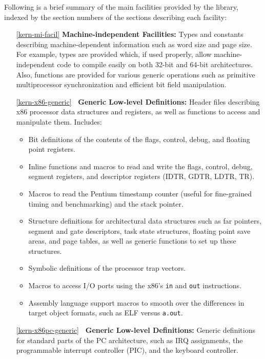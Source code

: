 Following is a brief summary of the main facilities provided by the library,
indexed by the section numbers of the sections describing each facility:
\begin{itemize}
\item[\ref{kern-mi-facil}]
	{\bf Machine-independent Facilities:}
	Types and constants describing machine-dependent information
	such as word size and page size.
	For example, types are provided which, if used properly,
	allow machine-independent code
	to compile easily on both 32-bit and 64-bit architectures.
	Also, functions are provided for various generic operations
	such as primitive multiprocessor synchronization
	and efficient bit field manipulation.
\item[\ref{kern-x86-generic}]
	{\bf\intel\ Generic Low-level Definitions:}
	Header files describing x86 processor data structures and registers,
	as well as functions to access and manipulate them.
	Includes:
	\begin{itemize}
	\item	Bit definitions of the contents of the flags,
		control, debug, and floating point registers.
	\item	Inline functions and macros to read and write
		the flags, control, debug, segment registers,
		and descriptor registers (IDTR, GDTR, LDTR, TR).
	\item	Macros to read the Pentium timestamp counter
		(useful for fine-grained timing and benchmarking)
		and the stack pointer.
	\item	Structure definitions for architectural data structures
		such as far pointers, segment and gate descriptors,
		task state structures, floating point save areas,
		and page tables,
		as well as generic functions to set up these structures.
	\item	Symbolic definitions of the processor trap vectors.
	\item	Macros to access I/O ports
		using the x86's {\tt in} and {\tt out} instructions.
	\item	Assembly language support macros
		to smooth over the differences in target object formats,
		such as ELF versus {\tt a.out}.
	\end{itemize}
\item[\ref{kern-x86pc-generic}]
	{\bf\intelpc\ Generic Low-level Definitions:}
	Generic definitions for standard parts of the PC architecture,
	such as IRQ assignments, the programmable interrupt controller (PIC),
	and the keyboard controller.

\end{itemize}
